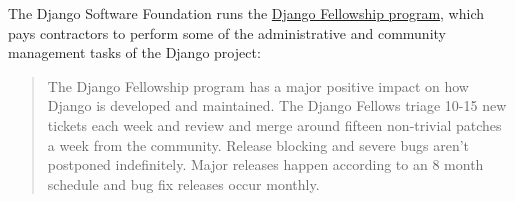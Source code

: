 \newpage

\begin{kaobox}[frametitle=Django Fellowship Program]

The Django Software Foundation runs the \href{https://www.djangoproject.com/fundraising/#fellowship-program}{Django Fellowship program}, which pays contractors to perform some of the administrative and community management tasks of the Django project:

\begin{quote}

The Django Fellowship program has a major positive impact on how Django is developed and maintained. The Django Fellows triage 10-15 new tickets each week and review and merge around fifteen non-trivial patches a week from the community. Release blocking and severe bugs aren't postponed indefinitely. Major releases happen according to an 8 month schedule and bug fix releases occur monthly.

\end{quote}

\end{kaobox}

